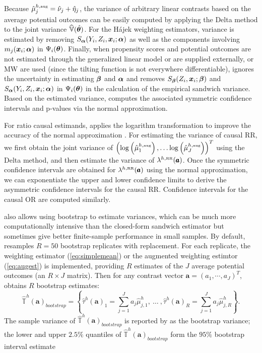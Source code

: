 Because $\hat{\mu}^{h,\mbox{\tiny{aug}}}_j=\hat{\nu}_j+\hat{\eta}_j$, the variance of arbitrary linear contrasts based on the average potential outcomes can be easily computed by applying the Delta method to the joint variance $\widehat{\operatorname{\mathbb V}}(\hat{\bm{\theta}})$. For the H\'ajek weighting estimators, variance is estimated by removing $S_{\bm{\alpha}}(Y_i,Z_i,\bm{x}_{i};\bm{\alpha})$ as well as the components involving $m_j(\bm{x}_i;\bm{\alpha})$ in $\Psi_{i}(\bm{\theta})$. Finally, when propensity scores and potential outcomes are not estimated through the generalized linear model or are supplied externally,  or MW are used (since the tilting function is not everywhere differentiable),  ignores  the uncertainty in estimating $\bm{\beta}$ and $\bm{\alpha}$ and removes $S_{\bm{\beta}}(Z_i,\bm{x}_{i};\bm{\beta})$ and $S_{\bm{\alpha}}(Y_i,Z_i,\bm{x}_{i};\bm{\alpha})$ in $\Psi_{i}(\bm{\theta})$ in the calculation of the empirical sandwich variance. Based on the estimated variance,  computes the associated symmetric confidence intervals and p-values via the normal approximation.   

For ratio causal estimands,  applies the logarithm transformation to improve the accuracy of the normal approximation \citep{agresti2003categorical}. For estimating the variance of causal RR, we first obtain the joint variance of $\left(\log\left(\hat{\mu}^{h,\mbox{\tiny{aug}}}_1\right),\ldots \log\left(\hat{\mu}^{h,\mbox{\tiny{aug}}}_J\right)\right)^T$ using the Delta method, and then estimate the variance of $\lambda^{h,\mbox{\tiny{RR}}}(\pmb{a})$. Once the symmetric confidence intervals are obtained for $\lambda^{h,\mbox{\tiny{RR}}}(\pmb{a})$ using the normal approximation, we can exponentiate the upper and lower confidence limits to derive the asymmetric confidence intervals for the causal RR. Confidence intervals for the causal OR are computed similarly. 


 also allows using bootstrap to estimate variances, which can be much more computationally intensive than the closed-form sandwich estimator but sometimes give better finite-sample performance in small samples. By default,  resamples $R=50$ bootstrap replicates with replacement. For each replicate, the weighting estimator (\ref{eq:simplemean}) or the augmented weighting estimtor (\ref{eq:augest}) is implemented, providing $R$ estimates of the $J$ average potential outcomes (an $R\times J$ matrix). Then for any contrast vector $\pmb{a}=(a_{1},\cdots, a_{J})^T$,  obtains $R$ bootstrap estimates:
\begin{equation*}
  \hat{\mathbb{T}}^h(\pmb{a})_{bootstrap}=  \left\{\hat{\tau}^h(\pmb{a})_1=\sum_{j=1}^{J} a_{j} \hat{\mu}^h_{j,1},~\ldots~, \hat{\tau}^h(\pmb{a})_R=\sum_{j=1}^{J} a_{j} \hat{\mu}^h_{j,R} \right\}.
\end{equation*}
The sample variance of $\hat{\mathbb{T}}^h(\pmb{a})_{bootstrap}$ is reported by  as the bootstrap variance; the lower and upper $2.5\%$ quantiles of $\hat{\mathbb{T}}^h(\pmb{a})_{bootstrap}$ form the $95\%$ bootstrap interval estimate 

